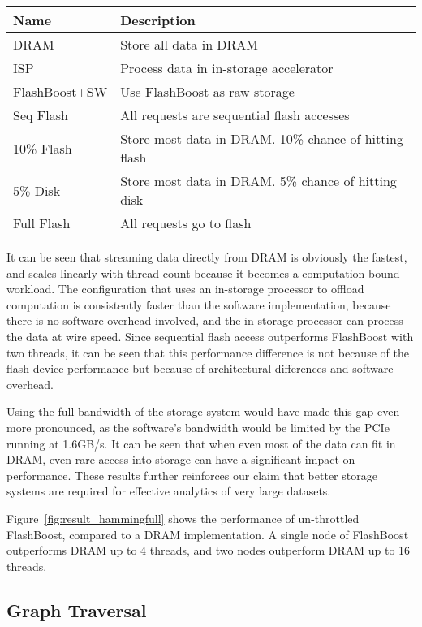 \begin{tabular}{l | p{0.25\paperwidth}}
\label{tab:nearest_neighbor}
Name & Description \\
\hline \hline
DRAM & Store all data in DRAM \\
ISP & Process data in in-storage accelerator \\
FlashBoost+SW & Use FlashBoost as raw storage \\
Seq Flash & All requests are sequential flash accesses \\
10\% Flash & Store most data in DRAM. 10\% chance of hitting flash \\
5\% Disk & Store most data in DRAM. 5\% chance of hitting disk \\
Full Flash & All requests go to flash \\
\hline
\end{tabular}

It can be seen that streaming data directly from DRAM is obviously the fastest, and
scales linearly with thread count because it becomes a computation-bound
workload. The configuration that uses an in-storage processor to offload
computation is consistently faster than the software implementation, because
there is no software overhead involved, and the in-storage processor can process
the data at wire speed. Since sequential flash access outperforms FlashBoost
with two threads, it can be seen that this performance difference is not because
of the flash device performance but because of architectural differences and
software overhead.

Using the full bandwidth of the storage system would
have made this gap even more pronounced, as the software's bandwidth would be
limited by the PCIe running at 1.6GB/s. It can be seen that when even most of
the data can fit in DRAM, even rare access into storage can have a significant
impact on performance. These results further reinforces our claim that better
storage systems are required for effective analytics of very large datasets.

Figure~\ref{fig:result_hammingfull} shows the performance of un-throttled
FlashBoost, compared to a DRAM implementation. A single node of FlashBoost
outperforms DRAM up to 4 threads, and two nodes outperform DRAM up to 16
threads.

\subsection{Graph Traversal}

